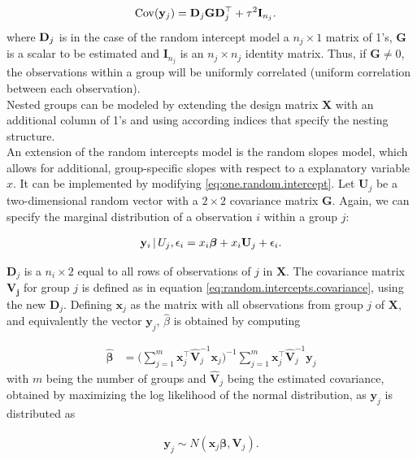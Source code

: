 \documentclass[11pt,a4paper,twoside]{book}\usepackage[]{graphicx}\usepackage[]{color}
\begin{document}
\begin{align}
\operatorname{Cov}(\mathbf{y}_j) &= \mathbf{D}_j \mathbf{G} \mathbf{D}_j^\top + \tau^2 \mathbf{I}_{n_j}. \label{eq:random.intercepts.covariance}
\end{align}
where ${\mathbf{D}}_j$ is in the case of the random intercept model a $n_j \times 1$ matrix of 1's, $\mathbf{G}$ is a scalar to be estimated and $\mathbf{I}_{n_j}$ is an $n_j \times n_j$ identity matrix. Thus, if $\mathbf{G} \neq 0$, the observations within a group will be uniformly correlated (uniform correlation between each observation). \\
Nested groups can be modeled by extending the design matrix $\mathbf{X}$ with an additional column of 1's and using according indices that specify the nesting structure.\\
An extension of the random intercepts model is the random slopes model, which allows for additional, group-specific slopes with respect to a explanatory variable $x$. It can be implemented by modifying \eqref{eq:one.random.intercept}. Let $\mathbf{U}_j$ be a two-dimensional random vector with a $2 \times 2$ covariance matrix $\mathbf{G}$. Again, we can specify the marginal distribution of a observation $i$ within a group $j$:

\begin{align}
\mathbf{y}_i \,\vert\, U_j,\epsilon_i =  x_i\boldsymbol{\beta}+ x_i \mathbf{U}_j + \epsilon_i. \label{eq:one.random.intercept.and.slope}
\end{align}

$\mathbf{D}_j$ is a $n_i \times 2$ equal to all rows of observations of $j$ in $\mathbf{X}$. The covariance matrix $\mathbf{V_j}$ for group $j$ is defined as in equation \eqref{eq:random.intercepts.covariance}, using the new $\mathbf{D}_j$. Defining $\mathbf{x}_j$ as the matrix with all observations from group $j$ of $\mathbf{X}$, and equivalently the vector $\mathbf{y}_j$, $\hat{\beta}$ is obtained by computing

\begin{align}
\hat{\boldsymbol{\beta}} &= \Big( \sum_{j = 1}^m \mathbf{x}_j^\top \hat{\mathbf{V}}_j^{-1} \mathbf{x}_j \Big)^{-1} \sum_{j = 1}^m \mathbf{x}_j^\top \hat{\mathbf{V}}_j^{-1} \mathbf{y}_j
\end{align}
with $m$ being the number of groups and $\hat{\mathbf{V}}_j$ being the estimated covariance, obtained by maximizing the log likelihood of the normal distribution, as $\mathbf{y}_j$ is distributed as

\begin{align}
\mathbf{y}_j \sim N(\mathbf{x}_j \boldsymbol{\beta}, \mathbf{V}_j). \nonumber
\end{align}
\end{document}
